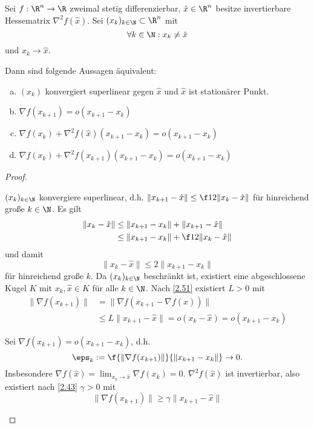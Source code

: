 \begin{st} \label{2.52}
	Sei $f: \R^n \to \R$ zweimal stetig differenzierbar, $\hat x \in \R^n$ besitze invertierbare Hessematrix $\nabla^2 f(\hat x)$.
	Sei $(x_k)_{k\in\N} \subset \R^n$ mit
	\[
		\forall k \in \N : x_k \neq \hat x
	\]
	und $x_k \to \hat x$.

	Dann sind folgende Aussagen äquivalent:
	\begin{enumerate}[(a)]
		\item
			$(x_k)$ konvergiert superlinear gegen $\hat x$  und $\hat x$ ist stationärer Punkt.
		\item
			$\nabla f(x_{k+1}) = o(x_{k+1} - x_k)$
		\item
			$\nabla f(x_k) + \nabla^2 f(\hat x)(x_{k+1} - x_k) = o(x_{k+1} - x_k)$
		\item
			$\nabla f(x_k) + \nabla^2 f(x_{k+1})(x_{k+1} - x_k) = o(x_{k+1} - x_k)$
	\end{enumerate}
	\begin{proof}
		\begin{segnb}[„(a)$\implies$(b)“]
			$(x_k)_{k\in\N}$ konvergiere superlinear, d.h. $\|x_{k+1} - \hat x\| \le \f 12 \|x_k - \hat x\|$ für hinreichend große $k \in \N$.
			Es gilt
			\begin{align*}
				\|x_k - \hat x\|
				&\le \|x_{k+1} - x_k\| + \|x_{k+1} - \hat x\| \\
				&\le \|x_{k+1} - x_k\| + \f 12 \|x_k - \hat x\|
			\end{align*}
			und damit
			\[
				\|x_k - \hat x\|
				\le 2 \|x_{k+1} - x_k\|
			\]
			für hinreichend große $k$.
			Da $(x_k)_{k\in\N}$ beschränkt ist, existiert eine abgeschlossene Kugel $K$ mit $x_k, \hat x \in K$ für alle $k \in \N$.
			Nach \ref{2.51} existiert $L > 0$ mit
			\begin{align*}
				\|\nabla f(x_{k+1}) \|
				&= \| \nabla f(x_{k+1} - \nabla f(\hat x)) \| \\
				&\le L \|x_{k+1} - \hat x\|
				= o(x_k - \hat x)
				= o(x_{k+1} - x_k)
			\end{align*}
		\end{segnb}
		\begin{segnb}[„(b)$\implies$(a)“]
			Sei $\nabla f(x_{k+1}) = o(x_{k+1} - x_k)$, d.h.
			\[
				\eps_k := \f {\|\nabla f(x_{k+1})\|}{\|x_{k+1} - x_k\|}
				\to 0.
			\]
			Insbesondere $\nabla f(\hat x) = \lim_{x_k \to \hat x} \nabla f(x_k) = 0$.
			$\nabla^2 f(\hat x)$ ist invertierbar, also existiert nach \ref{2.43} $\gamma > 0$ mit
			\[
				\|\nabla f(x_{k+1}) \|
				\ge \gamma \|x_{k+1} - \hat x\|
\]
\end{segnb}
\end{proof}
\end{st}
